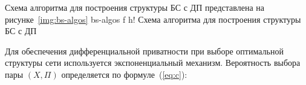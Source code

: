 	
		

\newpage
Схема алгоритма для построения структуры БС с ДП представлена на рисунке~\ref{img:bs-algos}
{bs-algos} %
{f} %
{h!} %
{\textwidth} %
{Схема алгоритма для построения структуры БС с ДП} %


Для обеспечения дифференциальной приватности при выборе оптимальной структуры сети используется экспоненциальный механизм. Вероятность выбора пары $(X, \Pi)$ определяется по формуле~(\ref{eq:c}):

